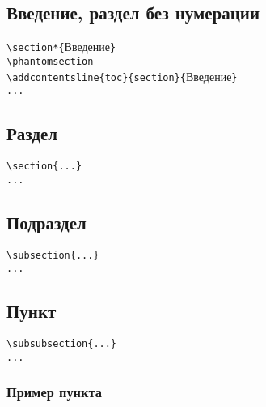\documentclass[14pt, a4paper, titlepage]{extarticle}
\renewcommand{\thesection}{\Asbuk{section}}
\let\oldsec\section
\renewcommand{\section}{
        \clearpage
        \phantomsection
        \refstepcounter{section}
        \addcontentsline{toc}{section}{\appendixname~\thesection}
        \oldsec*} %
\begin{document}
\subsection{Введение, раздел без нумерации}

\noindent\verb"\section*{"Введение\verb"}"\\
\verb"\phantomsection"\\
\verb"\addcontentsline{toc}{section}{"Введение\verb"}"\\
\verb"..."

\subsection{Раздел}

\begin{verbatim}
\section{...}
...
\end{verbatim}

\subsection{Подраздел}

\begin{verbatim}
\subsection{...}
...
\end{verbatim}

\subsection{Пункт}

\begin{verbatim}
\subsubsection{...}
...
\end{verbatim}

\subsubsection{Пример пункта}
\end{document}

